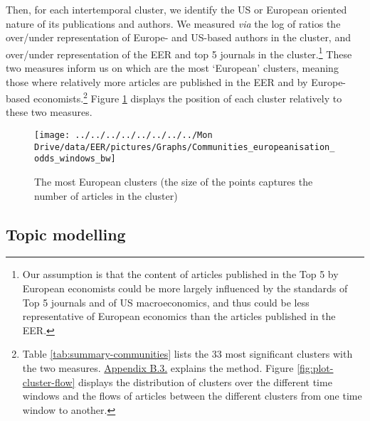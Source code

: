 \documentclass[
  12pt,
  onecolumn]{article}
\begin{document}
Then, for each intertemporal cluster, we identify the US or European
oriented nature of its publications and authors. We measured \emph{via}
the log of ratios the over/under representation of Europe- and US-based
authors in the cluster, and over/under representation of the EER and top
5 journals in the cluster.\footnote{Our assumption is that the content
  of articles published in the Top 5 by European economists could be
  more largely influenced by the standards of Top 5 journals and of US
  macroeconomics, and thus could be less representative of European
  economics than the articles published in the EER.} These two measures
inform us on which are the most `European' clusters, meaning those where
relatively more articles are published in the EER and by Europe-based
economists.\footnote{Table \ref{tab:summary-communities} lists the 33
  most significant clusters with the two measures.
  \protect\hyperlink{network}{Appendix B.3.} explains the method. Figure
  \ref{fig:plot-cluster-flow} displays the distribution of clusters over
  the different time windows and the flows of articles between the
  different clusters from one time window to another.} Figure
\ref{fig:plot-community-diff} displays the position of each cluster
relatively to these two measures.

\begin{figure}[h]

{\centering \texttt{[image: ../../../../../../../../Mon Drive/data/EER/pictures/Graphs/Communities\_europeanisation\_odds\_windows\_bw]} 

}

\caption{The most European clusters (the size of the points captures the number of articles in the cluster)}\label{fig:plot-community-diff}
\end{figure}

\hypertarget{topic-modelling}{%
\subsection{Topic modelling}\label{topic-modelling}}
\end{document}
